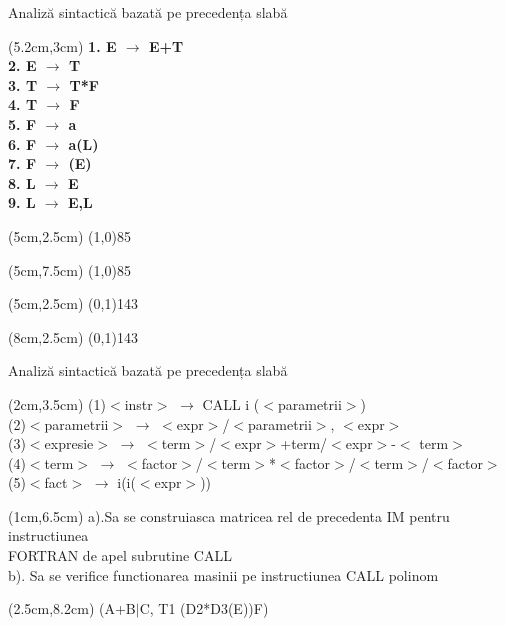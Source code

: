 \documentclass[pdf]{beamer}
\begin{document}
\begin{frame}{Analiză sintactică bazată pe precedența slabă}

\begin{textblock*}{16cm}(5.2cm,3cm)
\textbf
{1. E $\rightarrow$ E+T \\
2. E $\rightarrow$ T    \\
3. T $\rightarrow$ T*F  \\
4. T $\rightarrow$ F    \\ 
5. F $\rightarrow$ a    \\ 
6. F $\rightarrow$ a(L) \\
7. F $\rightarrow$ (E)   \\
8. L $\rightarrow$ E \\
9. L $\rightarrow$ E,L 
}
\end{textblock*}

\begin{textblock*}{16cm}(5cm,2.5cm)
\line(1,0){85}
\end{textblock*}

\begin{textblock*}{16cm}(5cm,7.5cm)
\line(1,0){85}
\end{textblock*}

\begin{textblock*}{16cm}(5cm,2.5cm)
\line(0,1){143}
\end{textblock*}

\begin{textblock*}{16cm}(8cm,2.5cm)
\line(0,1){143}
\end{textblock*}

\end{frame}



\begin{frame}{Analiză sintactică bazată pe precedența slabă}
\begin{textblock*}{16cm}(2cm,3.5cm)
(1)$<$instr$>$ $\rightarrow$ CALL i ({$<$}parametrii{$>$}) \\
(2)$<$parametrii$>$ $\rightarrow$ $<$expr$>$/$<$parametrii$>$, $<$expr$>$ \\
(3)$<$expresie$>$ $\rightarrow$ $<$term$>$/$<$expr$>$+term/$<$expr$>$-$<$ term$>$ \\
(4)$<$term$>$ $\rightarrow$ $<$factor$>$/$<$term$>$*$<$factor$>$/$<$term$>$/$<$factor$>$ \\
(5)$<$fact$>$ $\rightarrow$ i(i($<$expr$>$))
\end{textblock*}

\begin{textblock*}{16cm}(1cm,6.5cm)
a).Sa se construiasca matricea rel de precedenta IM pentru instructiunea \\ FORTRAN de apel subrutine CALL\\
b). Sa se verifice functionarea masinii pe instructiunea CALL polinom
\end{textblock*}

\begin{textblock*}{16cm}(2.5cm,8.2cm)
(A+B$|$C, T1 (D2*D3(E))F)
\end{textblock*}
\end{frame}
\end{document}
